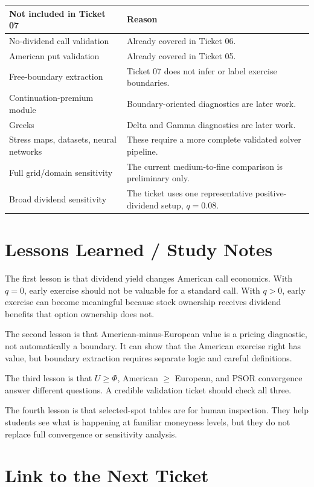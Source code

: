 \documentclass[11pt,a4paper]{article}
\begin{document}
\begin{longtable}{L{0.34\textwidth}L{0.54\textwidth}}
\toprule
Not included in Ticket 07 & Reason \\
\midrule
\endhead
No-dividend call validation & Already covered in Ticket 06. \\
American put validation & Already covered in Ticket 05. \\
Free-boundary extraction & Ticket 07 does not infer or label exercise boundaries. \\
Continuation-premium module & Boundary-oriented diagnostics are later work. \\
Greeks & Delta and Gamma diagnostics are later work. \\
Stress maps, datasets, neural networks & These require a more complete validated solver pipeline. \\
Full grid/domain sensitivity & The current medium-to-fine comparison is preliminary only. \\
Broad dividend sensitivity & The ticket uses one representative positive-dividend setup, \(q=0.08\). \\
\bottomrule
\end{longtable}

\section{Lessons Learned / Study Notes}

The first lesson is that dividend yield changes American call economics. With \(q=0\), early
exercise should not be valuable for a standard call. With \(q>0\), early exercise can become
meaningful because stock ownership receives dividend benefits that option ownership does not.

The second lesson is that American-minus-European value is a pricing diagnostic, not
automatically a boundary. It can show that the American exercise right has value, but boundary
extraction requires separate logic and careful definitions.

The third lesson is that \(U\geq\Phi\), American \(\geq\) European, and PSOR convergence answer
different questions. A credible validation ticket should check all three.

The fourth lesson is that selected-spot tables are for human inspection. They help students see
what is happening at familiar moneyness levels, but they do not replace full convergence or
sensitivity analysis.

\section{Link to the Next Ticket}
\end{document}
